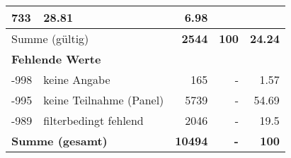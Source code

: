 \begin{longtable}{lXrrr}
       \num{733} &
       \num[round-mode=places,round-precision=2]{28,81} &
         \num[round-mode=places,round-precision=2]{6,98} \\
     \midrule
     \multicolumn{2}{l}{Summe (gültig)} &
       \textbf{\num{2544}} &
     \textbf{100} &
       \textbf{\num[round-mode=places,round-precision=2]{24,24}} \\
     \multicolumn{5}{l}{\textbf{Fehlende Werte}}\\
       -998 &
       keine Angabe &
         \num{165} &
        - &
         \num[round-mode=places,round-precision=2]{1,57} \\
       -995 &
       keine Teilnahme (Panel) &
         \num{5739} &
        - &
         \num[round-mode=places,round-precision=2]{54,69} \\
       -989 &
       filterbedingt fehlend &
         \num{2046} &
        - &
         \num[round-mode=places,round-precision=2]{19,5} \\
     \midrule
     \multicolumn{2}{l}{\textbf{Summe (gesamt)}} &
          \textbf{\num{10494}} &
        \textbf{-} &
        \textbf{100} \\
     \bottomrule
     \end{longtable}
     
